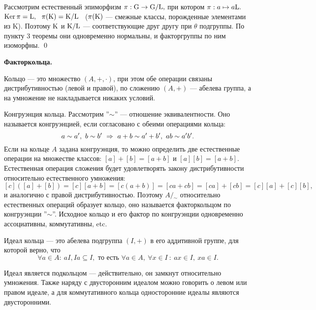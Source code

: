 \dok Рассмотрим естественный эпиморфизм $\pi : {\rm G}\rightarrow {\rm G}/{\rm L},$ при котором $\pi : a\mapsto a{\rm L}.$ ${\rm Ker}\,\pi={\rm L}, \ \ \pi({\rm K})={\rm K}/{\rm L}$
\ ($\pi({\rm K})$ --- смежные классы, порожденные элементами из \rr K). Поэтому ${\rm K}$ и ${\rm K}/{\rm L}$ --- соответствующие друг другу при $\theta$ подгруппы.
По пункту 3 теоремы они одновременно нормальны, и факторгруппы по ним изоморфны. \quad\qed
\smallskip

\centerline{\bf Факторкольца.}
\smallskip

Кольцо --- это множество $(A, +, \cdot)$, при этом обе операции связаны дистрибутивностью (левой и правой), по сложению $(A, +)$ --- абелева группа, а
на умножение не накладывается никаких условий.

Конгруэнция кольца. Рассмотрим ''$\sim$'' --- отношение эквивалентности. Оно называется конгруэнцией, если согласовано с обеими операциями кольца:
$$
a\sim a',\ b\sim b'\ \Rightarrow\  a+b\sim a'+b',\ ab\sim a'b'.
$$
Если на кольце $A$ задана конгруэнция, то можно определить две естественные операции на множестве классов: $[a]+[b]=[a+b]$ и $[a][b]=[a+b].$
Естественная операция сложения будет удовлетворять закону дистрибутивности относительно естественного умножения:
$$[c]\left([a]+[b]\right)=[c][a+b]=[c(a+b)]=[ca+cb]=[ca]+[cb]=[c][a]+[c][b],$$
и аналогично с правой дистрибутивностью. Поэтому $A/{}_{\sim}$ относительно естественных операций образует кольцо, оно называется факторкольцом по
конгруэнции ''$\sim$''. Исходное кольцо и его фактор по конгруэнции одновременно ассоциативны, коммутативны, etc.

\de Идеал кольца --- это абелева подгруппа $(I, +)$ в его аддитивной группе, для которой верно, что $$\forall a\in A:\
aI, Ia\subseteq I,\mbox{ то есть } \forall a\in A,\ \forall x\in I\ :\ ax\in I,\ xa\in I.
$$

Идеал является подкольцом --- действительно, он замкнут относительно умножения. Также наряду с двусторонним идеалом можно говорить о
левом или правом идеале, а для коммутативного кольца односторонние идеалы являются двусторонними.

